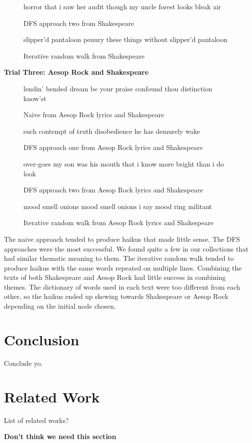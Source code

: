 \documentclass[]{article}
\newcommand{\comment}[1]
{\par {\bfseries \color{green} #1 \par}}
\begin{document}
\begin{figure}[H]
	\centering
	horror that i saw \break
	her audit though my uncle \break
	forest looks bleak air
	\caption{DFS approach two from Shakespeare}
	\label{fig:DFSTwoShakespeare}
\end{figure}

\begin{figure}[H]
	\centering
	slipper'd pantaloon \break
	penury these things without \break
	slipper'd pantaloon
	\caption{Iterative random walk from Shakespeare}
	\label{fig:IRWShakespeare}
\end{figure}

\begin{center}
	\textbf{Trial Three: Aesop Rock and Shakespeare}	
\end{center}

\begin{figure}[H]
	\centering
	lendin' bended dream \break
	be your praise confound thou \break
	distinction know'st
	\caption{Naive from Aesop Rock lyrics and Shakespeare}
	\label{fig:NaiveAesopShakespeare}
\end{figure}

\begin{figure}[H]
	\centering
	such contempt of truth \break
	disobedience he has \break
	demurely wake
	\caption{DFS approach one from Aesop Rock lyrics and Shakespeare}
	\label{fig:DFSOneAesopShakespeare}
\end{figure}

\begin{figure}[H]
	\centering
	over-goes my son \break
	was his mouth that i know more \break
	bright than i do look
	\caption{DFS approach two from Aesop Rock lyrics and Shakespeare}
	\label{fig:DFSTwoAesopShakespeare}
\end{figure}

\begin{figure}[H]
	\centering
	mood smell onions \break
	mood smell onions i say \break
	mood ring militant
	\caption{Iterative random walk from Aesop Rock lyrics and Shakespeare}
	\label{fig:IRWAesopShakespeare}
\end{figure}

The naive approach tended to produce haikus that made little sense. The DFS approaches were the most successful. We found quite a few in our collections that had similar thematic meaning to them. The iterative random walk tended to produce haikus with the same words repeated on multiple lines. Combining the texts of both Shakespeare and Aesop Rock had little success in combining themes. The dictionary of words used in each text were too different from each other, so the haikus ended up skewing towards Shakespeare or Aesop Rock depending on the initial node chosen.

\section{Conclusion}
Conclude yo.

\section{Related Work}
List of related works?
\comment{Don't think we need this section}



\end{document}
